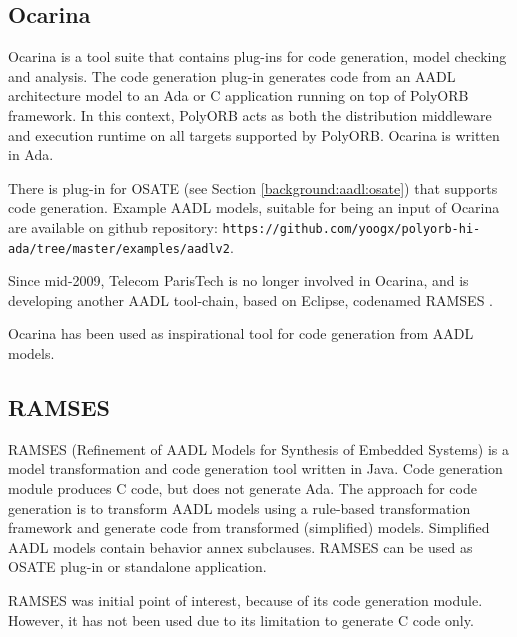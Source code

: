 \subsection{Ocarina}
\label{background:codegen:ocarina}

Ocarina \cite{Ocarina:Paper} is a tool suite that contains plug-ins for code generation, model checking and analysis. The code generation plug-in generates code from an AADL architecture model to an Ada or C application running on top of PolyORB framework. In this context, PolyORB acts as both the distribution middleware and execution runtime on all targets supported by PolyORB. Ocarina is written in Ada.

There is plug-in for OSATE (see Section \ref{background:aadl:osate}) that supports code generation. Example AADL models, suitable for being an input of Ocarina are available on github repository: \lstinline{https://github.com/yoogx/polyorb-hi-ada/tree/master/examples/aadlv2}.

Since mid-2009, Telecom ParisTech is no longer involved in Ocarina, and is developing another AADL tool-chain, based on Eclipse, codenamed RAMSES \cite{RAMSES:Paper}.

Ocarina has been used as inspirational tool for code generation from AADL models.  



\subsection{RAMSES}
\label{background:codegen:ramses}

RAMSES (Refinement of AADL Models for Synthesis of Embedded Systems) \cite{RAMSES:Paper} is a model transformation and code generation tool written in Java. Code generation module produces C code, but does not generate Ada. The approach for code generation is to transform AADL models using a rule-based transformation framework and generate code from transformed (simplified) models. Simplified AADL models contain behavior annex subclauses. RAMSES can be used as OSATE plug-in or standalone application.

RAMSES was initial point of interest, because of its code generation module. However, it has not been used due to its limitation to generate C code only.

